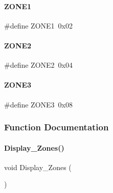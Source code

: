 \paragraph{Z\+O\+N\+E1}
{\footnotesize\ttfamily \#define Z\+O\+N\+E1~0x02}

\mbox{\label{a00059_aa74139205f47c6fc3fa32a099e63a379}} 
\paragraph{Z\+O\+N\+E2}
{\footnotesize\ttfamily \#define Z\+O\+N\+E2~0x04}

\mbox{\label{a00059_a471cb0bbd2e54887e741302774e67f45}} 
\paragraph{Z\+O\+N\+E3}
{\footnotesize\ttfamily \#define Z\+O\+N\+E3~0x08}



\subsubsection{Function Documentation}
\mbox{\label{a00059_a444b4ddad4c861dcfe350158ffe5d854}} 
\paragraph{Display\+\_\+\+Zones()}
{\footnotesize\ttfamily void Display\+\_\+\+Zones (\begin{DoxyParamCaption}{ }\end{DoxyParamCaption})}

